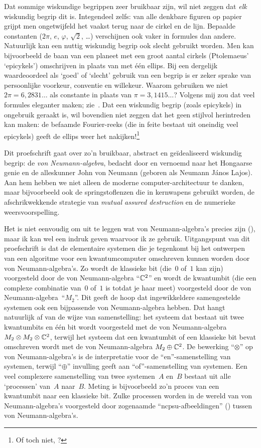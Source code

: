 \documentclass[b5paper]{book}
\begin{document}
Dat sommige wiskundige begrippen zeer bruikbaar zijn,
wil niet zeggen dat \emph{elk} wiskundig begrip dit is.
Integendeel zelfs:
van alle denkbare figuren op papier
grijpt men ongetwijfeld het vaakst terug
naar de cirkel en de lijn.
Bepaalde constanten ($2\pi$, $e$, $\varphi$, $\sqrt{2}$, \ldots) 
verschijnen ook vaker in formules dan andere.
Natuurlijk kan een nuttig wiskundig begrip 
ook slecht gebruikt worden.
Men kan bijvoorbeeld 
de baan van een planeet met een groot
aantal cirkels (Ptolemaeus' `epicykels') 
omschrijven in plaats van met \'e\'en ellips.
Bij een dergelijk waardeoordeel als `goed' of `slecht' gebruik
van een begrip is er zeker sprake van persoonlijke
voorkeur, conventie en willekeur. Waarom gebruiken
we niet $2\pi=6,\!2831\dotsc$
als constante in plaats van
$\pi=3,\!1415\dotsc$? Volgens mij zou
dat veel formules eleganter maken;
zie~\cite{palais2001pi}.
Dat een wiskundig begrip (zoals epicykels)
in ongebruik geraakt is, wil bovendien niet zeggen
dat het geen stijlvol herintreden kan maken:
de befaamde Fourier-reeks (die in feite bestaat uit oneindig veel epicykels)
geeft de ellips weer 
het nakijken!\footnote{Of toch niet,  \cite{mayer2010drawing}?}

Dit proefschrift gaat over zo'n bruikbaar, abstract en 
ge\"idealiseerd wiskundig begrip:
de \emph{von Neumann-algebra},
bedacht door en vernoemd naar het Hongaarse genie
en de alleskunner
John von Neumann (geboren als Neumann J\'anos Lajos).
Aan hem hebben we niet alleen
de moderne computer-architectuur te danken,
maar bijvoorbeeld ook de springstoflenzen die in kernwapens gebruikt worden,
de afschrikwekkende strategie van \emph{mutual assured destruction}
en de numerieke weersvoorspelling.

Het is niet eenvoudig om uit te leggen
 wat von Neumann-algebra's precies zijn (),
 maar 
ik kan wel een indruk geven waarvoor ik ze gebruik.
Uitgangspunt van dit proefschrift is dat 
de elementaire
systemen
die je tegenkomt bij het ontwerpen van een algoritme
voor een kwantumcomputer omschreven
kunnen worden door von Neumann-algebra's.
Zo wordt de klassieke bit (die~$0$ of~$1$ kan zijn)
voorgesteld door de von Neumann-algebra ``$\mathbb{C}^2$''
en wordt de kwantumbit (die een complexe combinatie van~$0$ of~$1$ is totdat
je haar meet)
voorgesteld door de von Neumann-algebra~``$M_2$''.
Dit geeft de hoop dat ingewikkeldere samengestelde systemen
ook een bijpassende von Neumann-algebra hebben.
Dat hangt natuurlijk af van de wijze van samenstelling:
het systeem dat bestaat uit twee kwantumbits en \'e\'en bit wordt voorgesteld
met de von Neumann-algebra $M_2\otimes M_2 \otimes \mathbb{C}^2$,
terwijl het systeem dat een kwantumbit of een klassieke bit bevat 
omschreven wordt met de von Neumann-algebra $M_2 \oplus \mathbb{C}^2$.
De bewerking ``$\otimes$'' op von Neumann-algebra's
is de interpretatie voor de  ``en''-samenstelling van systemen, 
terwijl ``$\oplus$''  invulling geeft aan ``of''-samenstelling van systemen.
Een veel complexere samenstelling van twee systemen~$A$ en~$B$
bestaat uit alle `processen' van~$A$ naar~$B$.
Meting is bijvoorbeeld zo'n proces van een kwantumbit naar een klassieke bit.
Zulke processen worden in de wereld van von Neumann-algebra's
voorgesteld door zogenaamde ``ncpsu-afbeeldingen'' ()
tussen von Neumann-algebra's.
\end{document}
